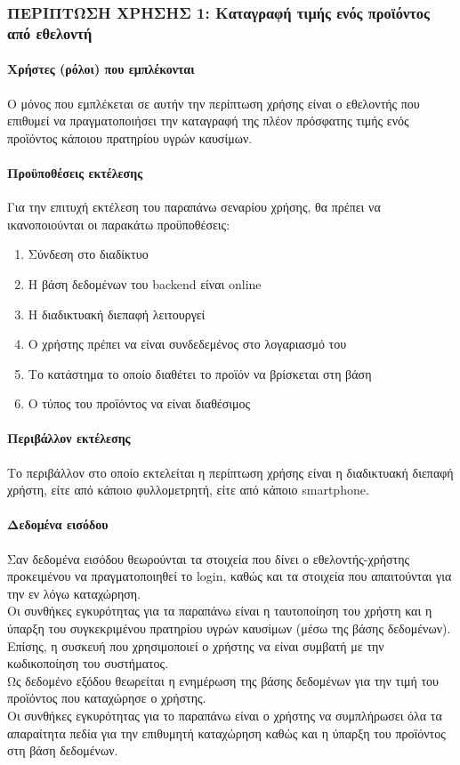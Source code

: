 \subsubsection{ΠΕΡΙΠΤΩΣΗ ΧΡΗΣΗΣ 1: Καταγραφή τιμής ενός προϊόντος από εθελοντή}
\paragraph{Χρήστες (ρόλοι) που εμπλέκονται}
Ο μόνος που εμπλέκεται σε αυτήν την περίπτωση χρήσης είναι ο εθελοντής που επιθυμεί να πραγματοποιήσει την καταγραφή της πλέον πρόσφατης τιμής ενός προϊόντος κάποιου πρατηρίου υγρών καυσίμων.
\paragraph{Προϋποθέσεις εκτέλεσης}
Για την επιτυχή εκτέλεση του παραπάνω σεναρίου χρήσης, θα πρέπει να ικανοποιούνται οι παρακάτω προϋποθέσεις:
\begin{enumerate}
	\item Σύνδεση στο διαδίκτυο
	\item Η βάση δεδομένων του backend είναι online
	\item Η διαδικτυακή διεπαφή λειτουργεί
	\item Ο χρήστης πρέπει να είναι συνδεδεμένος στο λογαριασμό του
	\item Το κατάστημα το οποίο διαθέτει το προϊόν να βρίσκεται στη βάση
	\item O τύπος του προϊόντος να είναι διαθέσιμος
\end{enumerate}
\paragraph{Περιβάλλον εκτέλεσης}
Το περιβάλλον στο οποίο εκτελείται η περίπτωση χρήσης είναι η διαδικτυακή διεπαφή χρήστη, είτε από κάποιο φυλλομετρητή, είτε από κάποιο smartphone.
\paragraph{Δεδομένα εισόδου}
Σαν δεδομένα εισόδου θεωρούνται τα στοιχεία που δίνει ο εθελοντής-χρήστης προκειμένου να πραγματοποιηθεί το login, καθώς και τα στοιχεία που απαιτούνται για την εν λόγω καταχώρηση. \\
Οι συνθήκες εγκυρότητας για τα παραπάνω είναι η ταυτοποίηση του χρήστη και η ύπαρξη του συγκεκριμένου πρατηρίου υγρών καυσίμων (μέσω της βάσης δεδομένων). Επίσης, η συσκευή που χρησιμοποιεί ο χρήστης να είναι συμβατή με την κωδικοποίηση του συστήματος.\\
Ως δεδομένο εξόδου θεωρείται η ενημέρωση της βάσης δεδομένων για την τιμή του προϊόντος που καταχώρησε ο χρήστης. \\
Οι συνθήκες εγκυρότητας για το παραπάνω είναι ο χρήστης να συμπλήρωσει όλα τα απαραίτητα πεδία για την επιθυμητή καταχώρηση καθώς και η ύπαρξη του προϊόντος στη βάση δεδομένων.
